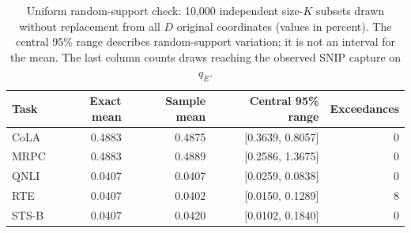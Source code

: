 \begin{table}[t]
\centering\small
\caption{Uniform random-support check: 10,000 independent size-$K$ subsets drawn without replacement from all $D$ original coordinates (values in percent). The central 95\% range describes random-support variation; it is not an interval for the mean. The last column counts draws reaching the observed SNIP capture on $q_E$.}
\label{tab:e5_random}
\begin{tabular}{lrrrr}
\toprule
Task & Exact mean & Sample mean & Central 95\% range & Exceedances \\
\midrule
CoLA & 0.4883 & 0.4875 & [0.3639, 0.8057] & 0 \\
MRPC & 0.4883 & 0.4889 & [0.2586, 1.3675] & 0 \\
QNLI & 0.0407 & 0.0407 & [0.0259, 0.0838] & 0 \\
RTE & 0.0407 & 0.0402 & [0.0150, 0.1289] & 8 \\
STS-B & 0.0407 & 0.0420 & [0.0102, 0.1840] & 0 \\
\bottomrule
\end{tabular}
\end{table}
